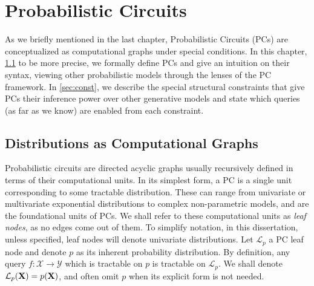 \chapter{Probabilistic Circuits}
\label{ch:pc}

As we briefly mentioned in the last chapter, Probabilistic Circuits (PCs) are conceptualized as
computational graphs under special conditions. In this chapter, \cref{sec:pc} to be more precise,
we formally define PCs and give an intuition on their syntax, viewing other probabilistic models
through the lenses of the PC framework. In \cref{sec:const}, we describe the special structural
constraints that give PCs their inference power over other generative models and state which
queries (as far as we know) are enabled from each constraint.

\section{Distributions as Computational Graphs}
\label{sec:pc}

Probabilistic circuits are directed acyclic graphs usually recursively defined in terms of their
computational units. In its simplest form, a PC is a single unit corresponding to some tractable
distribution. These can range from univariate or multivariate exponential distributions to complex
non-parametric models, and are the foundational units of PCs. We shall refer to these computational
units as \emph{leaf nodes}, as no edges come out of them. To simplify notation, in this
dissertation, unless specified, leaf nodes will denote univariate distributions. Let
$\mathcal{L}_p$ a PC leaf node and denote $p$ as its inherent probability distribution. By
definition, any query $f:\mathcal{X}\to\mathcal{Y}$ which is tractable on $p$ is tractable on
$\mathcal{L}_p$. We shall denote $\mathcal{L}_p(\mathbf{X})=p(\mathbf{X})$, and often omit $p$ when its
explicit form is not needed.

